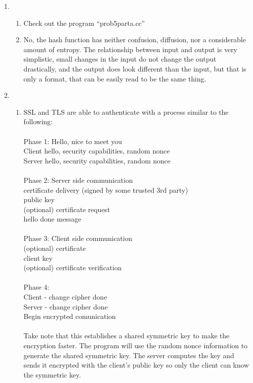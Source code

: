 \documentclass[a4paper, 11pt]{article}
\begin{document}
\begin{enumerate}
\item
  \begin{enumerate}
    \item
      Check out the program ``prob5parta.cc''\\

    \item
      No, the hash function has neither confusion, diffusion, nor a
      considerable amount of entropy.  The relationship between input
      and output is very simplistic, small changes in the input do not
      change the output drastically, and the output does look
      different than the input, but that is only a format, that can be
      easily read to be the same thing.
  \end{enumerate}
      
\item
  \begin{enumerate}
    \item
      SSL and TLS are able to authenticate with a process similar to
      the following:\\\\
      Phase 1: Hello, nice to meet you\\
        Client hello, security capabilities, random nonce\\
        Server hello, security capabilities, random nonce\\\\
      Phase 2: Server side communication\\
        certificate delivery (signed by some trusted 3rd party)\\
        public key\\
        (optional) certificate request\\
        hello done message\\\\
      Phase 3: Client side communication\\
        (optional) certificate\\
        client key\\
        (optional) certificate verification\\\\
      Phase 4:\\
        Client - change cipher done\\
        Server - change cipher done\\
        Begin encrypted comunication\\\\
      Take note that this establishes a shared symmetric key to make
      the encryption faster.  The program will use the random nonce
      information to generate the shared symmetric key.  The server
      computes the key and sends it encrypted with the client's public
      key so only the client can know the symmetric key.


\end{enumerate}
\end{enumerate}
\end{document}
